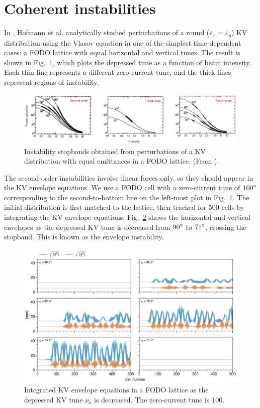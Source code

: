 \section*{Coherent instabilities}

In \cite{Hofmann1983}, Hofmann et al. analytically studied perturbations of a round ($\varepsilon_x = \varepsilon_y$) KV distribution using the Vlasov equation in one of the simplest time-dependent cases: a FODO lattice with equal horizontal and vertical tunes. The result is shown in Fig.~\ref{fig:stopbands}, which plots the depressed tune as a function of beam intensity. Each thin line represents a different zero-current tune, and the thick lines represent regions of instability.
%
\begin{figure}[!p]
    \centering
    \includegraphics[width=\textwidth]{Images/chapter1/stopbands_hor.png}
    \caption{Instability stopbands obtained from perturbations of a KV distribution with equal emittances in a FODO lattice. (From \cite{Hofmann1983}).}
    \label{fig:stopbands}
\end{figure}
%

The second-order instabilities involve linear forces only, so they should appear in the KV envelope equations. We use a FODO cell with a zero-current tune of $100\degree$ corresponding to the second-to-bottom line on the left-most plot in Fig.~\ref{fig:stopbands}. The initial distribution is first matched to the lattice, then tracked for 500 cells by integrating the KV envelope equations. Fig.~\ref{fig:envelope_instability} shows the horizontal and vertical envelopes as the depressed KV tune is decreased from $90\degree$ to $71\degree$, crossing the stopband. This is known as the envelope instability. 
%
\begin{figure}[!p]
    \centering
    \includegraphics[width=\textwidth]{Images/chapter1/envelope_instability.png}
    \caption{Integrated KV envelope equations in a FODO lattice as the depressed KV tune $\nu_x$ is decreased. The zero-current tune is 100\degree.} \label{fig:envelope_instability}
\end{figure}
%

